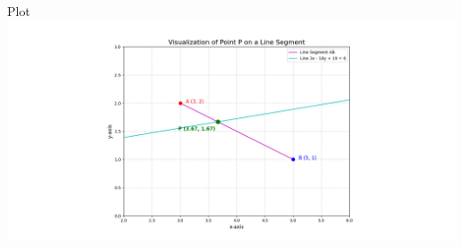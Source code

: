 \documentclass{beamer}
\begin{document}
\begin{frame}{Plot}
    \centering
    \includegraphics[width=\columnwidth, height=1\textheight, keepaspectratio]{figs/fig1.png} 
\end{frame}
\end{document}
